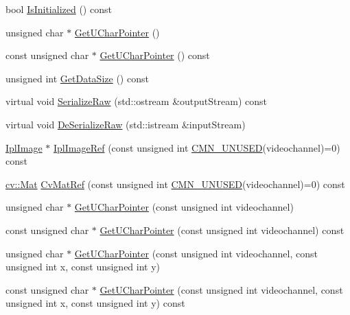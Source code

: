 \begin{DoxyCompactItemize}
\item 
bool \hyperlink{classsvl_sample_image_custom_a05a63a27f8d36c3a6d3da3e557401e34}{Is\+Initialized} () const 
\item 
unsigned char $\ast$ \hyperlink{classsvl_sample_image_custom_a20935c430bdfda2b8c2e47cedea54300}{Get\+U\+Char\+Pointer} ()
\item 
const unsigned char $\ast$ \hyperlink{classsvl_sample_image_custom_a98588a912725f4f68429db103ce99638}{Get\+U\+Char\+Pointer} () const 
\item 
unsigned int \hyperlink{classsvl_sample_image_custom_a55e36a7b9db217750f0d826bcc394464}{Get\+Data\+Size} () const 
\item 
virtual void \hyperlink{classsvl_sample_image_custom_a2d467642f90ec4dc898658e6e7dd0e31}{Serialize\+Raw} (std\+::ostream \&output\+Stream) const 
\item 
virtual void \hyperlink{classsvl_sample_image_custom_a068f71a3b20c7853f0930682278ecc6d}{De\+Serialize\+Raw} (std\+::istream \&input\+Stream)
\item 
\hyperlink{svl_types_8h_aa5a40a13021ba9708bfe921e18fdfa53}{Ipl\+Image} $\ast$ \hyperlink{classsvl_sample_image_custom_a7337dcd0860314cfb0780368d1fc2ee4}{Ipl\+Image\+Ref} (const unsigned int \hyperlink{cmn_portability_8h_a021894e2626935fa2305434b1e893ff6}{C\+M\+N\+\_\+\+U\+N\+U\+S\+E\+D}(videochannel)=0) const 
\item 
\hyperlink{namespacecv_a60d81b54f4914bec4cc4a72ab77eb444}{cv\+::\+Mat} \hyperlink{classsvl_sample_image_custom_ae84bf981005e615b3fa8128928d0a156}{Cv\+Mat\+Ref} (const unsigned int \hyperlink{cmn_portability_8h_a021894e2626935fa2305434b1e893ff6}{C\+M\+N\+\_\+\+U\+N\+U\+S\+E\+D}(videochannel)=0) const 
\item 
unsigned char $\ast$ \hyperlink{classsvl_sample_image_custom_a62661fb5cb361956db41ddca64fb8de4}{Get\+U\+Char\+Pointer} (const unsigned int videochannel)
\item 
const unsigned char $\ast$ \hyperlink{classsvl_sample_image_custom_a1c3e87a17fa2483ef99b778f11228ec5}{Get\+U\+Char\+Pointer} (const unsigned int videochannel) const 
\item 
unsigned char $\ast$ \hyperlink{classsvl_sample_image_custom_a1ed7950bd52f718bb21d6614f6197bac}{Get\+U\+Char\+Pointer} (const unsigned int videochannel, const unsigned int x, const unsigned int y)
\item 
const unsigned char $\ast$ \hyperlink{classsvl_sample_image_custom_abba3385b59196b344bbe8cba90013b68}{Get\+U\+Char\+Pointer} (const unsigned int videochannel, const unsigned int x, const unsigned int y) const 

\end{DoxyCompactItemize}
